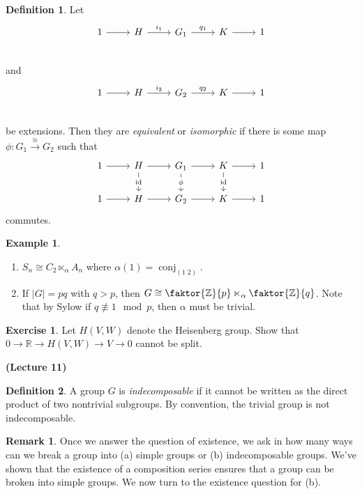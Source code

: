 \documentclass[10pt,letterpaper,cm]{nupset}
\theoremstyle{definition}
\newtheorem*{definition}{Definition}
\newtheorem{exmp}{Example}
\newtheorem{remark}{Remark}
\newtheorem{exercise}{Exercise}
\newcommand{\R}{\mathbb R}
\newcommand{\Z}{\mathbb Z}
\newcommand{\1}{\mathbf{1}}
\newcommand{\0}{\vec 0}
\DeclareMathOperator{\id}{id}
\DeclareMathOperator{\conj}{conj}
\begin{document}
\begin{definition}
Let \[
	\begin{tikzcd}
	1\rar &H\rar["i_1" above] & G_1 \rar["q_1" above] & K\rar& 1 \\
	\end{tikzcd}
\]
and 
\[
	\begin{tikzcd}
	1\rar &H\rar["i_2" above] & G_2 \rar["q_2" above] & K\rar& 1 \\
	\end{tikzcd}
\]
be extensions. Then they are \textit{equivalent} or \textit{isomorphic} if there is some map $\phi : G_1 \overset{\cong}{\longrightarrow} G_2$ such that 
\[
\begin{tikzcd}
1 \arrow[r] & H \arrow[r] \arrow[d, "\id" description] & G_1 \arrow[r] \arrow[d, "\phi" description] & K \arrow[r] \arrow[d, "\id" description] & 1 \\
1 \arrow[r] & H \arrow[r] & G_2 \arrow[r] & K \arrow[r] & 1
\end{tikzcd}
\]
commutes.
\end{definition}

\begin{exmp} $ $
\begin{enumerate}
\item $S_n \cong C_2 \ltimes_{\alpha} A_n$ where $\alpha(1) = \conj_{(1 \; 2)}$.
\item  If $|G| = pq$ with $q>p$, then $G \cong \faktor{\Z}{p} \ltimes_{\alpha} \faktor{\Z}{q}$. Note that by Sylow if $q\not \equiv 1 \mod p$, then $\alpha$ must be trivial. 
\end{enumerate}
\end{exmp}

\begin{exercise}
Let $H(V, W)$ denote the Heisenberg group. Show that $0 \to \R \to H(V, W) \to V \to 0$ cannot be split.
\end{exercise}

\begin{center}
{\textbf{(Lecture 11)}}
\end{center}

\begin{definition}
A group $G$ is \textit{indecomposable} if it cannot be written as the direct product of two nontrivial subgroups. By convention, the trivial group is not indecomposable. 
\end{definition}

\begin{remark}
Once we answer the question of existence, we ask in how many ways can we break a group into (a) simple groups or (b) indecomposable groups. We've shown that the existence of a composition series ensures that a group can be broken into simple groups. We now turn to the existence question for (b).
\end{remark}
\end{document}
